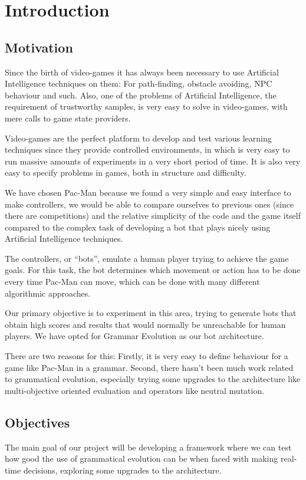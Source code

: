 \chapter{Introduction} \label{cap:introduction}

\section{Motivation}
Since the birth of video-games it has always been necessary to use Artificial Intelligence techniques on them: For path-finding, obstacle avoiding, NPC behaviour and such. Also, one of the problems of Artificial Intelligence, the requirement of trustworthy samples, is very easy to solve in video-games, with mere calls to game state providers.

Video-games are the perfect platform to develop and test various learning techniques since they provide controlled environments, in which is very easy to run massive amounts of experiments in a very short period of time. It is also very easy to specify problems in games, both in structure and difficulty.
 
We have chosen Pac-Man because we found a very simple and easy interface to make controllers, we would be able to compare ourselves to previous ones (since there are competitions) and the relative simplicity of the code and the game itself compared to the complex task of developing a bot that plays nicely using Artificial Intelligence techniques.
 
The controllers, or ``bots'', emulate a human player trying to achieve the game goals. For this task, the bot determines which movement or action has to be done every time Pac-Man can move, which can be done with many different algorithmic approaches.
 
Our primary objective is to experiment in this area, trying to generate bots that obtain high scores and results that would normally be unreachable for human players. We have opted for Grammar Evolution as our bot architecture.

There are two reasons for this: Firstly, it is very easy to define behaviour for a game like Pac-Man in a grammar. Second, there hasn't been much work related to grammatical evolution, especially trying some upgrades to the architecture like multi-objective oriented evaluation and operators like neutral mutation. 

\section{Objectives}
The main goal of our project will be developing a framework where we can test how good the use of grammatical evolution can be when faced with making real-time decisions, exploring some upgrades to the architecture.

